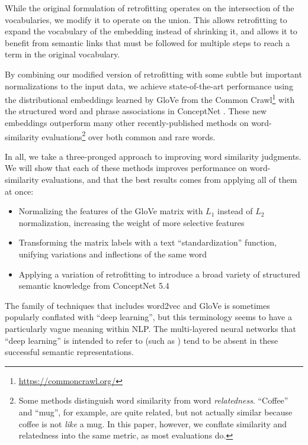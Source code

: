 \documentclass[letterpaper]{article}
\begin{document}
While the original formulation of retrofitting operates on the intersection of
the vocabularies, we modify it to operate on the union. This allows retrofitting
to expand the vocabulary of the embedding instead of shrinking it, and allows it
to benefit from semantic links that must be followed for multiple steps to reach
a term in the original vocabulary.

By combining our modified version of retrofitting with some subtle but important
normalizations to the input data, we achieve state-of-the-art performance using
the distributional embeddings learned by GloVe \cite{pennington2014glove} from
the Common Crawl\footnote{\url{https://commoncrawl.org/}} with the structured word and phrase
associations in ConceptNet \cite{speer2012conceptnet}. These new embeddings
outperform many other recently-published methods on word-similarity
evaluations\footnote{Some methods distinguish word similarity from word
{\em relatedness}. ``Coffee'' and ``mug'', for example, are quite related,
but not actually similar because coffee is not {\em like} a mug. In this paper,
however, we conflate similarity and relatedness into the same metric, as most
evaluations do.} over both common and rare words.

In all, we take a three-pronged approach to improving word similarity
judgments. We will show that each of these methods improves performance on
word-similarity evaluations, and that the best results comes from applying all
of them at once:

\begin{itemize}
\item Normalizing the features of the GloVe matrix with $L_1$ instead of $L_2$
    normalization, increasing the weight of more selective features
\item Transforming the matrix labels with a text ``standardization'' function,
    unifying variations and inflections of the same word
\item Applying a variation of retrofitting to introduce a broad variety of
    structured semantic knowledge from ConceptNet 5.4
\end{itemize}


The family of techniques that includes word2vec and GloVe is sometimes
popularly conflated with ``deep learning'', but this terminology seems to have
a particularly vague meaning within NLP. The multi-layered neural networks that
``deep learning'' is intended to refer to (such as )
tend to be absent in these successful semantic representations.
\end{document}
